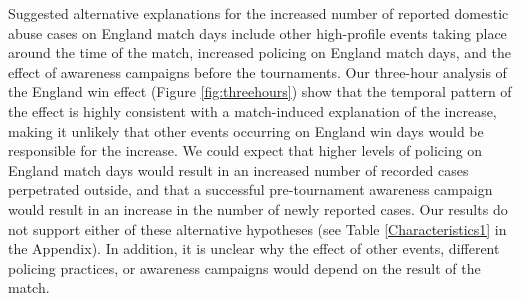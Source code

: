\documentclass[12pt, letterpaper]{article}
\newcommand{\NS}[1] {{\textcolor{green}{#1}}}
\newcommand{\TM}[1] {{\textcolor{orange}{#1}}}
\newcommand{\AT}[1] {{\textcolor{blue}{#1}}}
\begin{document}

Suggested alternative explanations for the increased number of reported domestic abuse cases on England match days include other high-profile events taking place around the time of the match, increased policing on England match days, and the effect of awareness campaigns before the tournaments\autocite{Brooks-Hay2018}. Our three-hour analysis of the England win effect (Figure \ref{fig:threehours}) show that the temporal pattern of the effect is highly consistent with a match-induced explanation of the increase, making it unlikely that other events occurring on England win days would be responsible for the increase. We could expect that higher levels of policing on England match days would result in an increased number of recorded cases perpetrated outside, and that a successful pre-tournament awareness campaign would result in an increase in the number of newly reported cases. Our results do not support either of these alternative hypotheses (see Table \ref{Characteristics1} in the Appendix). In addition, it is unclear why the effect of other events, different policing practices, or awareness campaigns would depend on the result of the match. 
\end{document}
